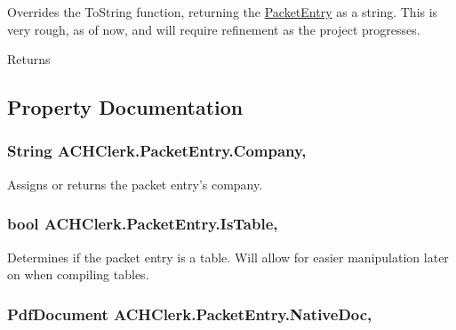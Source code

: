 Overrides the To\+String function, returning the \hyperlink{class_a_c_h_clerk_1_1_packet_entry}{Packet\+Entry} as a string. This is very rough, as of now, and will require refinement as the project progresses. 

\begin{DoxyReturn}{Returns}

\end{DoxyReturn}


\subsection{Property Documentation}
\hypertarget{class_a_c_h_clerk_1_1_packet_entry_adc6526f8427f62955cf5353e7067fff5}{
\subsubsection[{Company}]{\setlength{\rightskip}{0pt plus 5cm}String A\+C\+H\+Clerk.\+Packet\+Entry.\+Company\hspace{0.3cm}{\ttfamily [get]}, {\ttfamily [set]}}}\label{class_a_c_h_clerk_1_1_packet_entry_adc6526f8427f62955cf5353e7067fff5}


Assigns or returns the packet entry's company. 

\hypertarget{class_a_c_h_clerk_1_1_packet_entry_a4a1c4084b79b907b6a4f8ef9b91ba042}{
\subsubsection[{Is\+Table}]{\setlength{\rightskip}{0pt plus 5cm}bool A\+C\+H\+Clerk.\+Packet\+Entry.\+Is\+Table\hspace{0.3cm}{\ttfamily [get]}, {\ttfamily [set]}}}\label{class_a_c_h_clerk_1_1_packet_entry_a4a1c4084b79b907b6a4f8ef9b91ba042}


Determines if the packet entry is a table. Will allow for easier manipulation later on when compiling tables. 

\hypertarget{class_a_c_h_clerk_1_1_packet_entry_ab19c84887a206d860b73e2a1ac418459}{
\subsubsection[{Native\+Doc}]{\setlength{\rightskip}{0pt plus 5cm}Pdf\+Document A\+C\+H\+Clerk.\+Packet\+Entry.\+Native\+Doc\hspace{0.3cm}{\ttfamily [get]}, {\ttfamily [set]}}}\label{class_a_c_h_clerk_1_1_packet_entry_ab19c84887a206d860b73e2a1ac418459}


